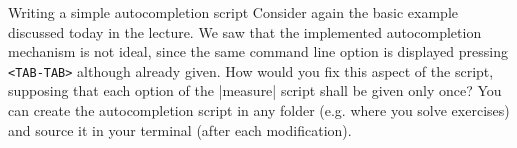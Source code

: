 
\begin{exercise}[Instructive]{Writing a simple autocompletion script}
    Consider again the basic example discussed today in the lecture.
    We saw that the implemented autocompletion mechanism is not ideal, since the same command line option is displayed pressing \texttt{<TAB-TAB>} although already given.
    How would you fix this aspect of the script, supposing that each option of the \bash|measure| script shall be given only once?
    You can create the autocompletion script in any folder (e.g. where you solve exercises) and source it in your terminal (after each modification).
\end{exercise}